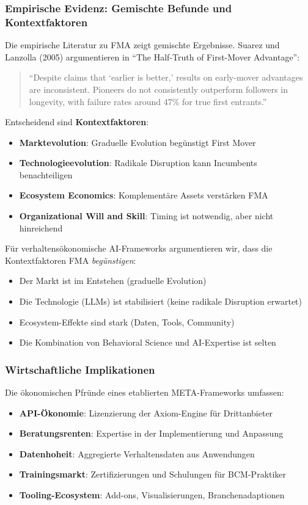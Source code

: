 \subsubsection{Empirische Evidenz: Gemischte Befunde und Kontextfaktoren}

Die empirische Literatur zu FMA zeigt gemischte Ergebnisse. Suarez und Lanzolla (2005) argumentieren in ``The Half-Truth of First-Mover Advantage'':

\begin{quote}
``Despite claims that `earlier is better,' results on early-mover advantages are inconsistent. Pioneers do not consistently outperform followers in longevity, with failure rates around 47\% for true first entrants.''
\end{quote}

Entscheidend sind \textbf{Kontextfaktoren}:
\begin{itemize}
    \item \textbf{Marktevolution}: Graduelle Evolution begünstigt First Mover
    \item \textbf{Technologieevolution}: Radikale Disruption kann Incumbents benachteiligen
    \item \textbf{Ecosystem Economics}: Komplementäre Assets verstärken FMA
    \item \textbf{Organizational Will and Skill}: Timing ist notwendig, aber nicht hinreichend
\end{itemize}

Für verhaltensökonomische AI-Frameworks argumentieren wir, dass die Kontextfaktoren FMA \textit{begünstigen}:
\begin{itemize}
    \item Der Markt ist im Entstehen (graduelle Evolution)
    \item Die Technologie (LLMs) ist stabilisiert (keine radikale Disruption erwartet)
    \item Ecosystem-Effekte sind stark (Daten, Tools, Community)
    \item Die Kombination von Behavioral Science und AI-Expertise ist selten
\end{itemize}

\subsubsection{Wirtschaftliche Implikationen}

Die ökonomischen Pfründe eines etablierten META-Frameworks umfassen:
\begin{itemize}
    \item \textbf{API-Ökonomie}: Lizenzierung der Axiom-Engine für Drittanbieter
    \item \textbf{Beratungsrenten}: Expertise in der Implementierung und Anpassung
    \item \textbf{Datenhoheit}: Aggregierte Verhaltensdaten aus Anwendungen
    \item \textbf{Trainingsmarkt}: Zertifizierungen und Schulungen für BCM-Praktiker
    \item \textbf{Tooling-Ecosystem}: Add-ons, Visualisierungen, Branchenadaptionen
\end{itemize}


